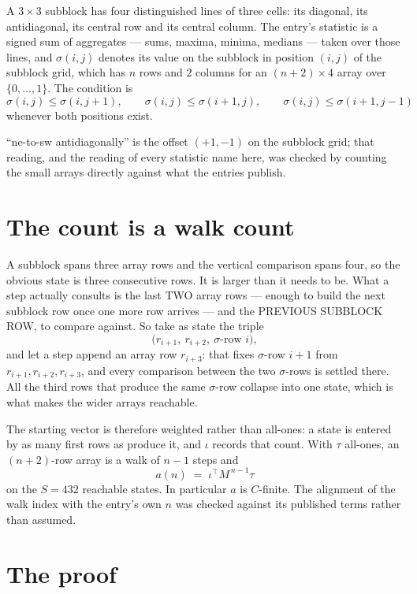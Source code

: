 \documentclass[11pt,a4paper]{article}
\theoremstyle{plain}
\theoremstyle{definition}
\begin{document}
A $3\times3$ subblock has four distinguished lines of three cells: its diagonal, its
antidiagonal, its central row and its central column. The entry's statistic is a signed sum of
aggregates --- sums, maxima, minima, medians --- taken over those lines, and $\sigma(i,j)$
denotes its value on the subblock in position $(i,j)$ of the subblock grid, which has $n$ rows
and $2$ columns for an $(n+2)\times4$ array over $\{0,\dots,1\}$. The condition is
\[
\sigma(i,j)\le\sigma(i,j+1),\qquad \sigma(i,j)\le\sigma(i+1,j),\qquad \sigma(i,j)\le\sigma(i+1,j-1)
\]
whenever both positions exist.

``ne-to-sw antidiagonally'' is the offset $(+1,-1)$ on the subblock grid; that reading, and
the reading of every statistic name here, was checked by counting the small arrays directly
against what the entries publish.

\section{The count is a walk count}

A subblock spans three array rows and the vertical comparison spans four, so the obvious state
is three consecutive rows. It is larger than it needs to be. What a step actually consults is
the last TWO array rows --- enough to build the next subblock row once one more row arrives ---
and the PREVIOUS SUBBLOCK ROW, to compare against. So take as state the triple
\[
\bigl(r_{i+1},\ r_{i+2},\ \sigma\text{-row }i\bigr),
\]
and let a step append an array row $r_{i+3}$: that fixes $\sigma$-row $i+1$ from
$r_{i+1},r_{i+2},r_{i+3}$, and every comparison between the two $\sigma$-rows is settled
there. All the third rows that produce the same $\sigma$-row collapse into one state, which is
what makes the wider arrays reachable.

The starting vector is therefore weighted rather than all-ones: a state is entered by as many
first rows as produce it, and $\iota$ records that count. With $\tau$ all-ones, an
$(n+2)$-row array is a walk of $n-1$ steps and
\[
a(n)\;=\;\iota^{\!\top}M^{\,n-1}\tau
\]
on the $S=432$ reachable states. In particular $a$ is $C$-finite. The alignment of the walk
index with the entry's own $n$ was checked against its published terms rather than assumed.

\section{The proof}
\end{document}
